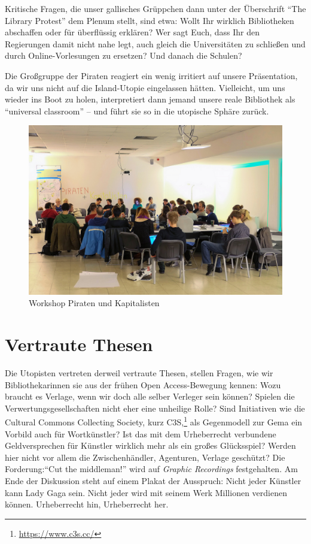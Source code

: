 \documentclass[a4paper,
fontsize=11pt,
oneside,
numbers=noperiodatend,
parskip=half-,
bibliography=totoc,
final
]{scrartcl}
\begin{document}
Kritische Fragen, die unser gallisches Grüppchen dann unter der
Überschrift \enquote{The Library Protest} dem Plenum stellt, sind etwa:
Wollt Ihr wirklich Bibliotheken abschaffen oder für überflüssig
erklären? Wer sagt Euch, dass Ihr den Regierungen damit nicht nahe legt,
auch gleich die Universitäten zu schließen und durch Online-Vorlesungen
zu ersetzen? Und danach die Schulen?

Die Großgruppe der Piraten reagiert ein wenig irritiert auf unsere
Präsentation, da wir uns nicht auf die Island-Utopie eingelassen hätten.
Vielleicht, um uns wieder ins Boot zu holen, interpretiert dann jemand
unsere reale Bibliothek als \enquote{universal classroom} -- und führt
sie so in die utopische Sphäre zurück.

\begin{figure}[htbp]
\centering
\includegraphics{./img/WorkshopPiratenundKapitalisten.jpg}
\caption{Workshop Piraten und Kapitalisten}
\end{figure}

\section*{Vertraute Thesen}\label{vertraute-thesen}

Die Utopisten vertreten derweil vertraute Thesen, stellen Fragen, wie
wir Bibliothekarinnen sie aus der frühen Open Access-Bewegung kennen:
Wozu braucht es Verlage, wenn wir doch alle selber Verleger sein können?
Spielen die Verwertungsgesellschaften nicht eher eine unheilige Rolle?
Sind Initiativen wie die Cultural Commons Collecting Society, kurz
C3S,\footnote{\url{https://www.c3s.cc/}} als Gegenmodell zur Gema ein
Vorbild auch für Wortkünstler? Ist das mit dem Urheberrecht verbundene
Geldversprechen für Künstler wirklich mehr als ein großes Glücksspiel?
Werden hier nicht vor allem die Zwischenhändler, Agenturen, Verlage
geschützt? Die Forderung:\enquote{Cut the middleman!} wird auf
\emph{Graphic Recordings} festgehalten. Am Ende der Diskussion steht auf
einem Plakat der Ausspruch: Nicht jeder Künstler kann Lady Gaga sein.
Nicht jeder wird mit seinem Werk Millionen verdienen können.
Urheberrecht hin, Urheberrecht her.
\end{document}
